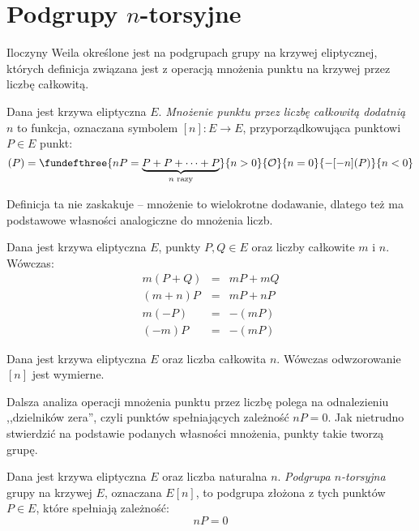\section{Podgrupy $n$-torsyjne}

Iloczyny Weila określone jest na podgrupach grupy na krzywej eliptycznej,
których definicja związana jest z operacją mnożenia punktu na krzywej
przez liczbę całkowitą.

\begin{definition}
Dana jest krzywa eliptyczna $E$.
\emph{Mnożenie punktu przez liczbę całkowitą dodatnią $n$}
to funkcja,
oznaczana symbolem $[n] \colon E \to E$,
przyporządkowująca punktowi $P \in E$ punkt:
\begin{equation}
[n](P) =
\fundefthree
{nP = \underbrace{P + P + \cdots + P}_{n\textrm{ razy}}}{n > 0}
{\ecident}{n = 0}
{-[-n](P)}{n < 0}
\end{equation}
\end{definition}

Definicja ta nie zaskakuje -- mnożenie to wielokrotne dodawanie,
dlatego też ma podstawowe własności analogiczne do mnożenia liczb.

\begin{fact}
Dana jest krzywa eliptyczna $E$, punkty $P, Q \in E$
oraz liczby całkowite $m$ i $n$.
Wówczas:
\begin{eqnarray*}
m(P + Q) & = & mP + mQ \\
(m + n)P & = & mP + nP \\
m(-P) & = & -(mP) \\
(-m)P & = & -(mP)
\end{eqnarray*}
\end{fact}


\begin{theorem}
Dana jest krzywa eliptyczna $E$ oraz liczba całkowita $n$.
Wówczas odwzorowanie $[n]$ jest wymierne.
\end{theorem}

Dalsza analiza operacji mnożenia punktu przez liczbę
polega na odnalezieniu ,,dzielników zera'',
czyli punktów spełniających zależność $nP = 0$.
Jak nietrudno stwierdzić na podstawie podanych własności mnożenia,
punkty takie tworzą grupę.

\begin{definition}
Dana jest krzywa eliptyczna $E$
oraz liczba naturalna $n$.
\emph{Podgrupa $n$-torsyjna} grupy na krzywej $E$,
oznaczana $E[n]$,
to podgrupa złożona z tych punktów $P \in E$,
które spełniają zależność:
\begin{equation}
nP = 0
\end{equation}
\end{definition}

